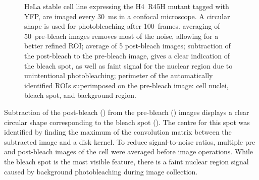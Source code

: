       \begin{figure}
        \centering
        \hfill
        \hfill
          {
            HeLa stable cell line expressing the H4~R45H mutant tagged with YFP,
            are imaged every \SI{30}{\ms} in a confocal microscope. A circular
            shape is used for photobleaching after 100~frames.
             averaging of 50~pre-bleach
            images removes most of the noise, allowing for a better refined
            ROI;
             average of
            5 post-bleach images;
             subtraction of the
            post-bleach to the pre-bleach image, gives a clear indication
            of the bleach spot, as well as faint signal for the nuclear
            region due to unintentional photobleaching;
             perimeter of the
            automatically identified ROIs superimposed on the pre-bleach
            image: cell nuclei, bleach spot, and background region.
          }
        \label{fig:kill-frap:roi}
      \end{figure}

      Subtraction of the post-bleach () from
      the pre-bleach () images displays
      a clear circular shape corresponding to the bleach spot ().
      The centre for this spot was identified by finding the maximum of the convolution matrix
      between the subtracted image and a disk kernel.
      To reduce signal-to-noise ratios, multiple pre and post-bleach images of the cell
      were averaged before image operations.
      While the bleach spot is the most visible feature, there is a faint nuclear region signal
      caused by background photobleaching during image collection.

